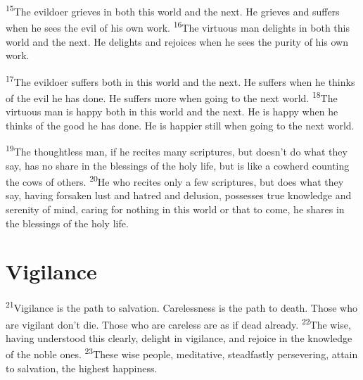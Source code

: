 \documentclass[openany,12pt,english]{book}
\newenvironment{para}{\par\pretolerance=100\tolerance=200\setlength{\emergencystretch}{0.6em}\relax}{\par}
\begin{document}
\begin{para}
    \textsuperscript{15}\thinspace{}The evil\-do\-er grieves in both this world and the next. He grieves and suffers when he sees the evil of his own work.
    \textsuperscript{16}\thinspace{}The vir\-tu\-ous man delights in both this world and the next. He delights and rejoices when he sees the pu\-ri\-ty of his own work.
\end{para}

\begin{para}
    \textsuperscript{17}\thinspace{}The evil\-do\-er suffers both in this world and the next. He suffers when he thinks of the evil he has done. He suffers more when go\-ing to the next world.
    \textsuperscript{18}\thinspace{}The vir\-tu\-ous man is hap\-py both in this world and the next. He is hap\-py when he thinks of the good he has done. He is hap\-pi\-er still when go\-ing to the next world.
\end{para}

\begin{para}
    \textsuperscript{19}\thinspace{}The thought\-less man, if he recites man\-y scriptures, but does\-n't do what they say, has no share in the blessings of the ho\-ly life, but is like a cow\-herd counting the cows of others.
    \textsuperscript{20}\thinspace{}He who recites on\-ly a few scriptures, but does what they say, hav\-ing for\-sak\-en lust and ha\-tred and de\-lu\-sion, possesses true knowl\-edge and se\-ren\-i\-ty of mind, car\-ing for noth\-ing in this world or that to come, he shares in the blessings of the ho\-ly life.
\end{para}

\section*{Vigilance}
\begin{para}
    \textsuperscript{21}\thinspace{}Vig\-i\-lance is the path to sal\-va\-tion. Care\-less\-ness is the path to death. Those who are vig\-i\-lant don't die. Those who are care\-less are as if dead al\-read\-y.
    \textsuperscript{22}\thinspace{}The wise, hav\-ing un\-der\-stood this clear\-ly, de\-light in vig\-i\-lance, and re\-joice in the knowl\-edge of the no\-ble ones.
    \textsuperscript{23}\thinspace{}These wise peo\-ple, meditative, stead\-fast\-ly per\-se\-ver\-ing, at\-tain to sal\-va\-tion, the highest hap\-pi\-ness.
\end{para}
\end{document}
